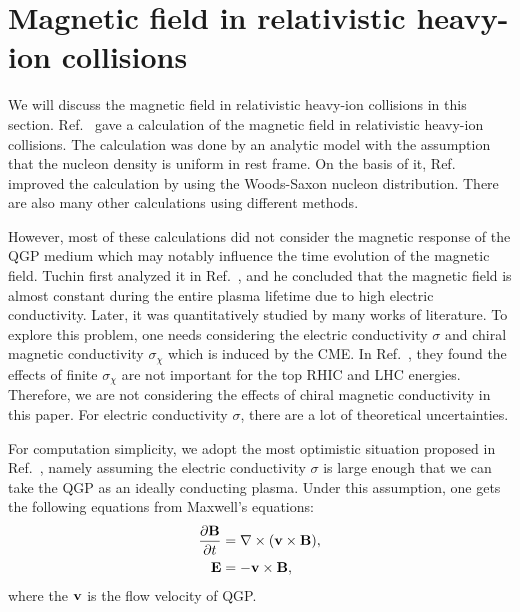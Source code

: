 \documentclass[preprint]{elsarticle}
\begin{document}
\section{Magnetic field in relativistic heavy-ion collisions}\label{eBinHIC}
We will discuss the magnetic field in relativistic heavy-ion collisions in this section. Ref.~\cite{Kharzeev:2007jp} gave a calculation of the magnetic field in relativistic heavy-ion collisions. The calculation was done by an analytic model with the assumption that the nucleon density is uniform in rest frame. On the basis of it, Ref.~\cite{Mo:2013qya} improved the calculation by using the Woods-Saxon nucleon distribution. There are also many other calculations using different methods\cite{Skokov:2009qp,Voronyuk:2011jd,Bzdak:2011yy,Deng:2012pc,Tuchin:2013apa}.

However, most of these calculations did not consider the magnetic response of the QGP medium which may notably influence the time evolution of the magnetic field. Tuchin first analyzed it in Ref.~\cite{Tuchin:2010vs,Tuchin:2010vs2}, and he concluded that the magnetic field is almost constant during the entire plasma lifetime due to high electric conductivity.
Later, it was quantitatively studied by many works of literature\cite{Deng:2012pc,Tuchin:2013apa,McLerran:2013hla,Tuchin:2013ie,Zakharov:2014dia,Tuchin:2014iua,Tuchin:2015oka}. To explore this problem, one needs considering the electric conductivity $\sigma$ and chiral magnetic conductivity $\sigma_\chi$ which is induced by the CME.  In Ref.~\cite{McLerran:2013hla}, they found the effects of finite $\sigma_\chi$ are not important for the top RHIC and LHC energies. Therefore, we are not considering the effects of chiral magnetic conductivity in this paper. For electric conductivity $\sigma$, there are a lot of theoretical uncertainties\cite{Arnold:2003zc, Gupta:2003zh, Ding:2010ga, Francis:2011bt}.

For computation simplicity, we adopt the most optimistic situation proposed in Ref.~\cite{Deng:2012pc}, namely assuming the electric conductivity $\sigma$ is large enough that we can take the QGP as an ideally conducting plasma. Under this assumption, one gets the following equations from Maxwell's equations:
\begin{align}
\frac{\partial \vb{B}}{\partial t} &= \nabla \times (\vb{v} \times \vb{B}),\label{eq:pBpt}  \\
\vb{E} &= - \vb{v} \times \vb{B}, \label{eq:E}
\end{align}
where the $\vb{v}$ is the flow velocity of QGP.
\end{document}
